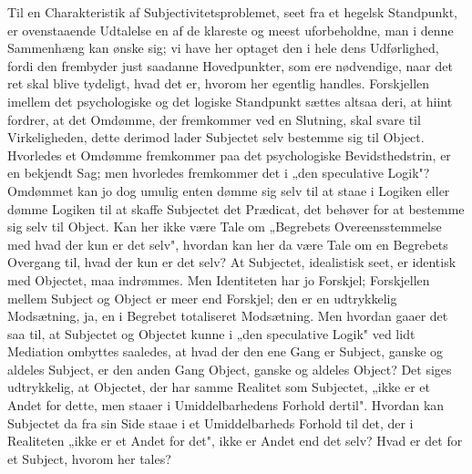 \documentclass[12pt]{book}
\newcommand{\opage}[1]{\marginnote{\footnotesize\textit{[#1]}}}
\begin{document}
Til en Charakteristik af Subjectivitetsproblemet, seet fra et hegelsk
Standpunkt, er ovenstaaende Udtalelse en af de klareste og meest uforbeholdne,
man i denne Sammenhæng kan ønske sig; vi have her optaget den i hele dens
Udførlighed, fordi den frembyder just saadanne Hovedpunkter, som ere nødvendige,
naar det ret skal blive tydeligt, hvad det er, hvorom her egentlig handles.
Forskjellen imellem det psychologiske og det logiske Standpunkt sættes altsaa
deri, at hiint fordrer, at det Omdømme, der fremkommer ved en Slutning, skal
svare til Virkeligheden, dette derimod lader Subjectet selv bestemme sig til
Object. Hvorledes et Omdømme fremkommer paa det psychologiske Bevidsthedstrin,
er en bekjendt Sag; men hvorledes fremkommer det i „den speculative Logik"?
Omdømmet kan jo dog umulig enten dømme sig selv til at staae i Logiken eller
dømme Logiken til at skaffe Subjectet det Prædicat, det behøver for at bestemme
sig selv til Object. Kan her ikke være Tale om „Begrebets Overeensstemmelse med
\opage{40} hvad der kun er det selv", hvordan kan her da være Tale om en Begrebets Overgang
til, hvad der kun er det selv? At Subjectet, idealistisk seet, er identisk med
Objectet, maa indrømmes. Men Identiteten har jo Forskjel; Forskjellen mellem
Subject og Object er meer end Forskjel; den er en udtrykkelig Modsætning, ja, en
i Begrebet totaliseret Modsætning. Men hvordan gaaer det saa til, at Subjectet
og Objectet kunne i „den speculative Logik" ved lidt Mediation ombyttes
saaledes, at hvad der den ene Gang er Subject, ganske og aldeles Subject, er den
anden Gang Object, ganske og aldeles Object? Det siges udtrykkelig, at Objectet,
der har samme Realitet som Subjectet, „ikke er et Andet for dette, men staaer i
Umiddelbarhedens Forhold dertil". Hvordan kan Subjectet da fra sin Side staae i
et Umiddelbarheds Forhold til det, der i Realiteten „ikke er et Andet for det",
ikke er Andet end det selv? Hvad er det for et Subject, hvorom her tales?
\end{document}

